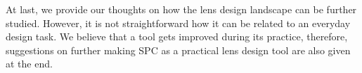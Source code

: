 At last, we provide our thoughts on how the lens design landscape can be further studied. However, it is not straightforward how it can be related to an everyday design task. We believe that a tool gets improved during its practice, therefore, suggestions on further making SPC as a practical lens design tool are also given at the end. 

\begin{comment}
We analyze the characteristics of the optical lens design space. We emphasize its dynamic property, which means the landscape changes given different design condition is changed, which is a common thing during the design practice

This dissertation addresses the typical problem during optical design or generally all engineering problem -- how to find the best solutions in a parameterized system. 

Goal/Nature of the problem: find the best solution -> assess whether the solution is sufficient or not, if it is not, the process should go to the next design decision; if it is sufficient, the solution can be taken. 

How: Parameterize the system with the multiple variables with a model representing its physical property therefore the performance can be evaluated.  
Given the model, use mathematical tools to optimize in order to get the best solution.
(alternatively, you can realize this by continuous testing and modifying during your manufacture -> caveman's method)

  Sub-problem statement: after parameterization, the optimization space of the system is usually a non-convex space, which indicates a presence of multiple local minima when a typical local optimizer is used. Situation of non-convex space provides difficulties in getting a satisfactory solution: it is difficult to find all the existing solutions in the design space. With incomplete set of information, the following question exist: will there be a better solution if one keeps searching given the current system configuration. As a results, techniques that can quickly generate new solutions given a design configuration is welcome to verify if a better system can be found. The process usually ends when a good enough result is found or a time limit is reached. 

Goal: Find whether there is a better solution in a non-convex optimization problem. This is global optimization. 

How: 
1) starting from a very good starting point (this indicates good technique is needed to construct the starting points) and after arriving at a local minimum, GO technique is used to check whether better solutions can be found (the anticipation is not). 


\end{comment}
